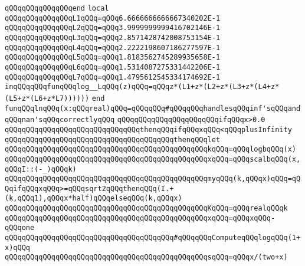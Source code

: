 \verb|qQQqqQQqqQQqqQQqend|\newline
\newline
\verb|local|\newline
\verb|qQQqqQQqqQQqqQQqL1qQQq=qQQq6.6666666666667340202E-1|\newline
\verb|qQQqqQQqqQQqqQQqL2qQQq=qQQq3.9999999999416702146E-1|\newline
\verb|qQQqqQQqqQQqqQQqL3qQQq=qQQq2.8571428742008753154E-1|\newline
\verb|qQQqqQQqqQQqqQQqL4qQQq=qQQq2.2222198607186277597E-1|\newline
\verb|qQQqqQQqqQQqqQQqL5qQQq=qQQq1.8183562745289935658E-1|\newline
\verb|qQQqqQQqqQQqqQQqL6qQQq=qQQq1.5314087275331442206E-1|\newline
\verb|qQQqqQQqqQQqqQQqL7qQQq=qQQq1.4795612545334174692E-1|\newline
\verb|inqQQqqQQqfunqQQqlog__LqQQq(z)qQQq=qQQqz*(L1+z*(L2+z*(L3+z*(L4+z*(L5+z*(L6+z*L7))))))|\newline
\verb|end|\newline
\newline
\verb|funqQQqlnqQQq(x:qQQqreal)qQQq=qQQqqQQq#qQQqqQQqhandlesqQQqinf'sqQQqandqQQqnan'sqQQqcorrectlyqQQq|\newline
\verb|qQQqqQQqqQQqqQQqqQQqqQQqifqQQqx>0.0|\newline
\verb|qQQqqQQqqQQqqQQqqQQqqQQqqQQqqQQqthenqQQqifqQQqxqQQq<qQQqplusInfinity|\newline
\verb|qQQqqQQqqQQqqQQqqQQqqQQqqQQqqQQqqQQqqQQqthenqQQqlet|\newline
\verb|qQQqqQQqqQQqqQQqqQQqqQQqqQQqqQQqqQQqqQQqqQQqqQQqkqQQq=qQQqlogbqQQq(x)|\newline
\verb|qQQqqQQqqQQqqQQqqQQqqQQqqQQqqQQqqQQqqQQqqQQqqQQqxqQQq=qQQqscalbqQQq(x,qQQqI::(-_)qQQqk)|\newline
\verb|qQQqqQQqqQQqqQQqqQQqqQQqqQQqqQQqqQQqqQQqqQQqqQQqmyqQQq(k,qQQqx)qQQq=qQQqifqQQqxqQQq>=qQQqsqrt2qQQqthenqQQq(I.+(k,qQQq1),qQQqx*half)qQQqelseqQQq(k,qQQqx)|\newline
\verb|qQQqqQQqqQQqqQQqqQQqqQQqqQQqqQQqqQQqqQQqqQQqqQQqKqQQq=qQQqrealqQQqk|\newline
\verb|qQQqqQQqqQQqqQQqqQQqqQQqqQQqqQQqqQQqqQQqqQQqqQQqxqQQq=qQQqxqQQq-qQQqone|\newline
\verb|qQQqqQQqqQQqqQQqqQQqqQQqqQQqqQQqqQQqqQQq#qQQqqQQqComputeqQQqlogqQQq(1+x)qQQq|\newline
\verb|qQQqqQQqqQQqqQQqqQQqqQQqqQQqqQQqqQQqqQQqqQQqqQQqsqQQq=qQQqx/(two+x)|\newline
